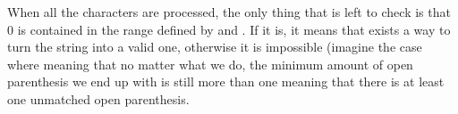 When all the characters are processed, the only thing that is left to check is that $0$ is contained in the range defined by  and . If it is, it means that exists a way to turn the string into a valid one, otherwise it is impossible (imagine the case where  meaning that no matter what we do, the minimum amount of open parenthesis we end up with is still more than one meaning that there is at least one unmatched open parenthesis.


